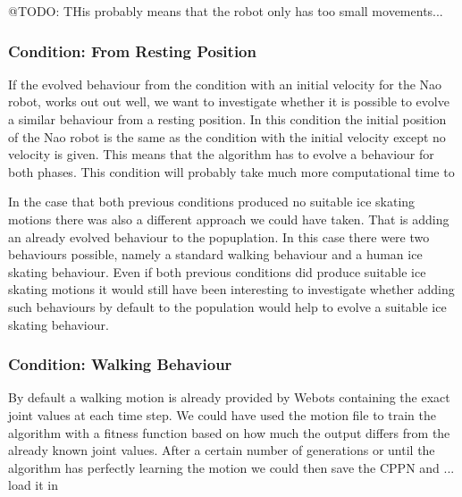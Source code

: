 \documentclass[a4paper,10pt]{article}
\begin{document}
@TODO: THis probably means that the robot only has too small movements...


\subsubsection{Condition: From Resting Position}
If the evolved behaviour from the condition with an initial velocity for the Nao robot, works out out well, we want to investigate whether it is possible to evolve a similar behaviour from a resting position. In this condition the initial position of the Nao robot is the same as the condition with the initial velocity except no velocity is given. This means that the algorithm has to evolve a behaviour for both phases. This condition will probably take much more computational time to 


In the case that both previous conditions produced no suitable ice skating motions there was also a different approach we could have taken. That is adding an already evolved behaviour to the popuplation. In this case there were two behaviours possible, namely a standard walking behaviour and a human ice skating behaviour. Even if both previous conditions did produce suitable ice skating motions it would still have been interesting to investigate whether adding such behaviours by default to the population would help to evolve a suitable ice skating behaviour.

\subsubsection{Condition: Walking Behaviour}
By default a walking motion is already provided by Webots containing the exact joint values at each time step. We could have used the motion file to train the algorithm with a fitness function based on how much the output differs from the already known joint values. After a certain number of generations or until the algorithm has perfectly learning the motion we could then save the CPPN and ... load it in 
\end{document}
